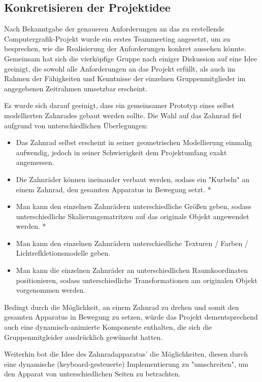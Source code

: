 \documentclass{article}
\begin{document}
\subsection{Konkretisieren der Projektidee}
Nach Bekanntgabe der genaueren Anforderungen an das zu erstellende Computergrafik-Projekt wurde ein erstes Teammeeting angesetzt, um zu besprechen, wie die Realisierung der Anforderungen konkret aussehen könnte. 
Gemeinsam hat sich die vierköpfige Gruppe nach einiger Diskussion auf eine Idee geeinigt, die sowohl alle Anforderungen an das Projekt erfüllt, als auch im Rahmen der Fähigkeiten und Kenntnisse der einzelnen Gruppenmitglieder im angegebenen Zeitrahmen umsetzbar erscheint. 

Es wurde sich darauf geeinigt, dass ein gemeinsamer Prototyp eines selbst modellierten Zahnrades gebaut werden sollte. 
Die Wahl auf das Zahnrad fiel aufgrund von unterschiedlichen Überlegungen:

\begin{itemize}
    \item Das Zahnrad selbst erscheint in seiner geometrischen Modellierung einmalig aufwendig, jedoch in seiner Schwierigkeit dem Projektumfang exakt angemessen. 
    \item Die Zahnräder können ineinander verbaut werden, sodass ein "Kurbeln" an einem Zahnrad, den gesamten Apparatus in Bewegung setzt. *
    \item Man kann den einzelnen Zahnrädern unterschiedliche Größen geben, sodass unterschiedliche Skalierungsmatritzen auf das originale Objekt angewendet werden. *
    \item Man kann den einzelnen Zahnrädern unterschiedliche Texturen / Farben / Lichtrefkletionsmodelle geben. 
    \item Man kann die einzelnen Zahnräder an unterschiedlichen Raumkoordinaten positionieren, sodass unterschiedliche Transformationen am originalen Objekt vorgenommen werden. 
\end{itemize}

Bedingt durch die Möglichkeit, an einem Zahnrad zu drehen und somit den gesamten Apparatus in Bewegung zu setzen, würde das Projekt dementsprechend auch eine dynamisch-animierte Komponente enthalten, die sich die Gruppenmitgleider ausdrücklich gewünscht hatten. 

Weiterhin bot die Idee des Zahnradapparatus' die Möglichkeiten, diesen durch eine dynamische (keyboard-gesteuerte) Implementierung zu "umschreiten", um den Apparat von unterschiedlichen Seiten zu betrachten. 
\end{document}
